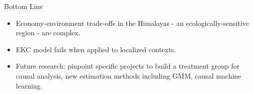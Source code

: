 \documentclass{beamer}
\begin{document}
    
    
    
    
    \begin{frame}{Bottom Line}
        \begin{itemize}
            \item Economy-environment trade-offs in the Himalayas - an ecologically-sensitive region - are complex.
            \item EKC model fails when applied to localized contexts.
            \item Future research: pinpoint specific projects to build a treatment group for causal analysis, new estimation methods including GMM, causal machine learning.
        \end{itemize}
    \end{frame}
\end{document}
